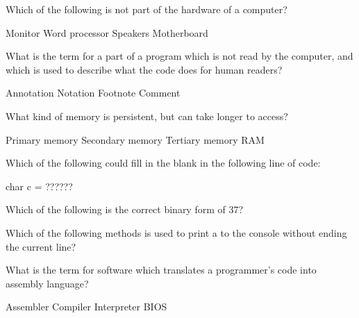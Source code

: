 \documentclass[answers,addpoints]{exam}
\begin{document}
\begin{questions}

\question Which of the following is not part of the hardware of a computer?
\begin{choices}
    \choice Monitor
    \CorrectChoice Word processor
    \choice Speakers
    \choice Motherboard
\end{choices}

\question What is the term for a part of a program which is not read by the computer, and which is used to describe what the code does for human readers?
\begin{choices}
    \choice Annotation
    \choice Notation
    \choice Footnote
    \CorrectChoice Comment
\end{choices}

\question What kind of memory is persistent, but can take longer to access?
\begin{choices}
    \choice Primary memory
    \CorrectChoice Secondary memory
    \choice Tertiary memory
    \choice RAM
\end{choices}

\question Which of the following could fill in the blank in the following line of code:
    \begin{code}
        char c = ??????
    \end{code}
\begin{choices}
    \choice {}
    \choice {}
    \CorrectChoice {}
    \choice {}
\end{choices}

\question Which of the following is the correct binary form of 37?
\begin{choices}
\end{choices}

\question Which of the following methods is used to print a  to the console without ending the current line?
\begin{choices}
    \choice {}
    \choice {}
    \choice {}
    \CorrectChoice {}
\end{choices}

\question What is the term for software which translates a programmer's code into assembly language?
\begin{choices}
    \choice Assembler
    \CorrectChoice Compiler
    \choice Interpreter
    \choice BIOS
\end{choices}


\end{questions}
\end{document}
